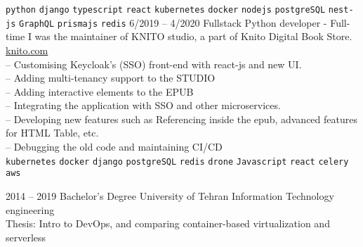 \documentclass[9pt]{developercv}
\begin{document}
\begin{entrylist}
{		\texttt{python}\slashsep
		\texttt{django}\slashsep
		\texttt{typescript}\slashsep
		\texttt{react}\slashsep
		\texttt{kubernetes}\slashsep
		\texttt{docker}\slashsep
		\texttt{nodejs}\slashsep
		\texttt{postgreSQL}\slashsep
		\texttt{nest-js}\slashsep
		\texttt{GraphQL}\slashsep
		\texttt{prismajs}\slashsep
		\texttt{redis}\slashsep
		}
		\entry
		{6/2019 -- 4/2020}
		{Fullstack Python developer - Full-time}
		{}
		{
			I was the maintainer of KNITO studio, a part of Knito Digital Book Store.
			\href{https://knito.com/}{knito.com} \\
		-- Customising Keycloak's (SSO) front-end with react-js and new UI. \\
		-- Adding multi-tenancy support to the STUDIO \\
		-- Adding interactive elements to the EPUB \\
		-- Integrating the application with SSO and other microservices. \\
		-- Developing new features such as Referencing inside the epub, advanced features for HTML Table, etc. \\
		-- Debugging the old code and maintaining CI/CD \\
		\texttt{kubernetes}\slashsep
		\texttt{docker}\slashsep
		\texttt{django}\slashsep
		\texttt{postgreSQL}\slashsep
		\texttt{redis}\slashsep
		\texttt{drone}\slashsep
		\texttt{Javascript}\slashsep
		\texttt{react}\slashsep
		\texttt{celery}\slashsep
		\texttt{aws}\slashsep
	}

\end{entrylist}

\begin{entrylist}
	\entry
	{2014 -- 2019}
	{Bachelor's Degree}
	{University of Tehran}
	{
		Information Technology engineering \\
		Thesis: Intro to DevOps, and comparing container-based virtualization and serverless \\
	}
\end{entrylist}
\end{document}
